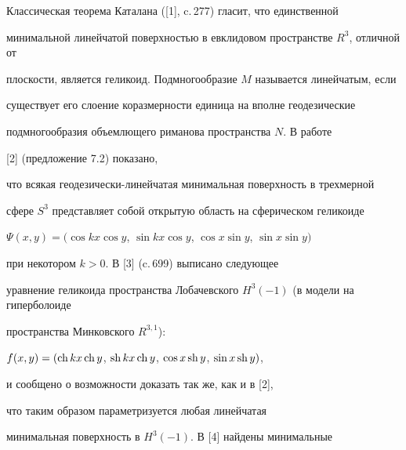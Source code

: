 \date{}




\pagestyle{plain} %







\maketitle


\label{begin}











Классическая теорема Каталана ([1], c.\,277) гласит, что единственной 


минимальной линейчатой поверхностью в евклидовом пространстве $R^3$, отличной от 


плоскости, является геликоид. Подмногообразие $M$ называется линейчатым, если 


существует его слоение коразмерности единица на вполне геодезические 


подмногообразия объемлющего риманова пространства $N$. В работе 


[2] (предложение 7.2) показано, 


что всякая геодезически-линейчатая минимальная поверхность в трехмерной 


сфере $S^3$ представляет собой открытую область на сферическом геликоиде  


$\Psi (x,y)=(\cos kx \cos y$, $\sin kx \cos y$, $\cos x \sin y$, $\sin x \sin y)$ 


при некотором $k>0$. В [3] (c.\,699) выписано следующее 


уравнение геликоида пространства Лобачевского $H^3(-1)$ (в модели на гиперболоиде 


пространства Минковского $R^{3,1}$): 


$f(x,y)=(\operatorname{ch} kx\operatorname{ch} y$, $\operatorname{sh} kx\operatorname{ch} y$, $\cos x \operatorname{sh} y$, $\sin x \operatorname{sh} y)$,


и сообщено о возможности доказать так же, как и в [2],


что таким образом параметризуется любая линейчатая 


минимальная поверхность в $H^3(-1)$. В [4] найдены минимальные   


